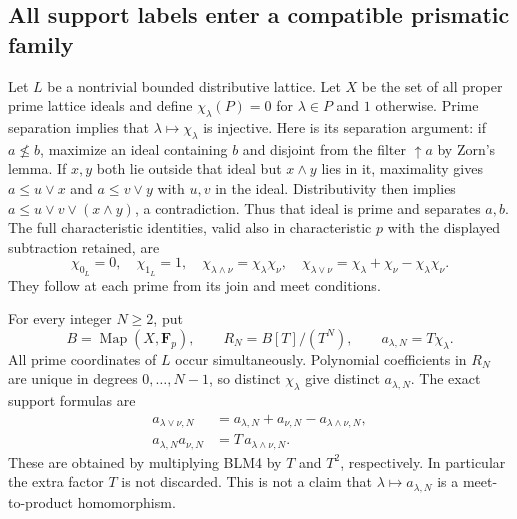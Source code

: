 \subsection{All support labels enter a compatible prismatic family}
Let $L$ be a nontrivial bounded distributive lattice. Let $X$ be
the set of all proper prime lattice ideals and define
$\chi_\lambda(P)=0$ for $\lambda\in P$ and $1$ otherwise.
Prime separation implies that $\lambda\mapsto\chi_\lambda$ is
injective. Here is its separation argument: if $a\not\le b$,
maximize an ideal containing $b$ and disjoint from the filter
$\uparrow a$ by Zorn's lemma. If $x,y$ both lie outside that
ideal but $x\wedge y$ lies in it, maximality gives
$a\le u\vee x$ and $a\le v\vee y$ with $u,v$ in the ideal.
Distributivity then implies $a\le u\vee v\vee(x\wedge y)$,
a contradiction. Thus that ideal is prime and separates $a,b$.
The full characteristic identities, valid also in characteristic
$p$ with the displayed subtraction retained, are
\begin{equation}\tag{BLM4}
\chi_{0_L}=0,\quad \chi_{1_L}=1,\quad
\chi_{\lambda\wedge\nu}=\chi_\lambda\chi_\nu,\quad
\chi_{\lambda\vee\nu}=\chi_\lambda+\chi_\nu-\chi_\lambda\chi_\nu.
\end{equation}
They follow at each prime from its join and meet conditions.

For every integer $N\ge2$, put
\begin{equation}\tag{BLM5}
B=\operatorname{Map}(X,\mathbf F_p),\qquad
R_N=B[T]/(T^N),\qquad a_{\lambda,N}=T\chi_\lambda.
\end{equation}
All prime coordinates of $L$ occur simultaneously. Polynomial
coefficients in $R_N$ are unique in degrees $0,\ldots,N-1$,
so distinct $\chi_\lambda$ give distinct $a_{\lambda,N}$.
The exact support formulas are
\begin{equation}\tag{BLM6}
\begin{split}
a_{\lambda\vee\nu,N}&=a_{\lambda,N}+a_{\nu,N}
                         -a_{\lambda\wedge\nu,N},\\
a_{\lambda,N}a_{\nu,N}&=T\,a_{\lambda\wedge\nu,N}.
\end{split}
\end{equation}
These are obtained by multiplying BLM4 by $T$ and $T^2$,
respectively. In particular the extra factor $T$ is not discarded.
This is not a claim that $\lambda\mapsto a_{\lambda,N}$ is
a meet-to-product homomorphism.

